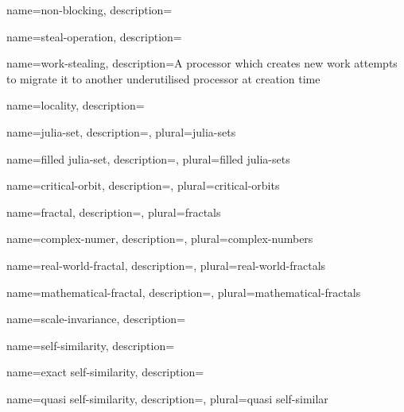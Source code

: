 {
    name={non-blocking},
    description={}
}

{
    name={steal-operation},
    description={}
}

{
    name={work-stealing},
    description={A processor which creates new work attempts to migrate it to 
                 another underutilised processor at creation time}
}

{
    name={locality},
    description={}
}

{
    name={julia-set},
    description={},
    plural={julia-sets}
}

{
    name={filled julia-set},
    description={},
    plural={filled julia-sets}
}

{
    name={critical-orbit},
    description={},
    plural={critical-orbits}
}

{
    name={fractal},
    description={},
    plural={fractals}
}

{
    name={complex-numer},
    description={},
    plural={complex-numbers}
}

{
    name={real-world-fractal},
    description={},
    plural={real-world-fractals}
}

{
    name={mathematical-fractal},
    description={},
    plural={mathematical-fractals}
}

{
    name={scale-invariance},
    description={}
}

{
    name={self-similarity},
    description={}
}

{
    name={exact self-similarity},
    description={}
}

{
    name={quasi self-similarity},
    description={},
    plural={quasi self-similar}
}
